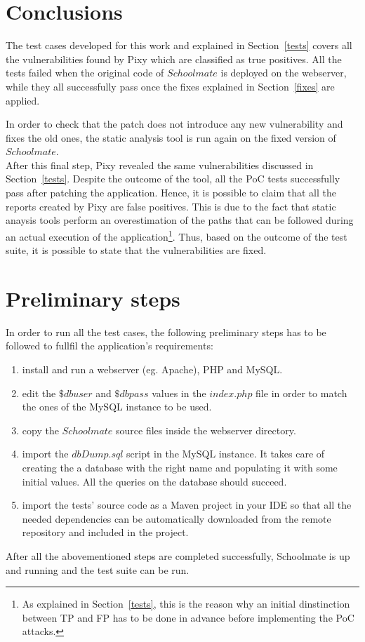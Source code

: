 \documentclass{sig-alternate-05-2015}
\begin{document}
\section{Conclusions}\label{outcomes}
The test cases developed for this work and explained in Section~\ref{tests} covers all the
vulnerabilities found by Pixy which are classified as true positives. All the tests failed when
the original code of $Schoolmate$ is deployed on the webserver, while they all successfully pass
once the fixes explained in Section~\ref{fixes} are applied.

In order to check that the patch does not introduce any new vulnerability and fixes the old ones,
the static analysis tool is run again on the fixed version of $Schoolmate$.\\
After this final step, Pixy revealed the same vulnerabilities discussed in Section~\ref{tests}.
Despite the outcome of the tool, all the PoC tests successfully pass after patching the application.
Hence, it is possible to claim that all the reports created by Pixy are false positives.
This is due to the fact that static anaysis
tools perform an overestimation of the paths that can be followed during an actual execution
of the application\footnote{As explained in Section~\ref{tests}, this is the reason why an initial
dinstinction between TP and FP has to be done in advance before implementing the PoC attacks.}.
Thus, based on the outcome of the test suite, it is possible to state that the vulnerabilities are
fixed.


\section{Preliminary steps}\label{steps}
In order to run all the test cases, the following preliminary steps has to be followed
to fullfil the application's requirements:
\begin{enumerate}
    \item install and run a webserver (eg. Apache), PHP and MySQL.
    \item edit the $\$dbuser$ and $\$dbpass$ values in the $index.php$ file in order
        to match the ones of the MySQL instance to be used.
    \item copy the $Schoolmate$ source files inside the webserver directory.
    \item import the $dbDump.sql$ script in the MySQL instance. It takes care of creating
        the a database with the right name and populating it with some initial values.
        All the queries on the database should succeed.
    \item import the tests' source code as a Maven project in your IDE so that all the
        needed dependencies can be automatically downloaded from the remote repository
        and included in the project.
\end{enumerate}
After all the abovementioned steps are completed successfully, Schoolmate is up and running
and the test suite can be run.
\end{document}
